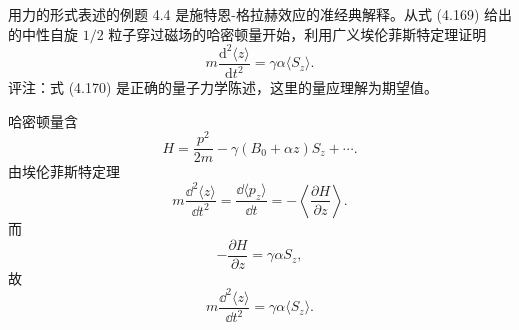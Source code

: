 \begin{question}
用力的形式表述的例题 4.4 是施特恩-格拉赫效应的准经典解释。从式 (4.169) 给出的中性自旋 $1/2$ 粒子穿过磁场的哈密顿量开始，利用广义埃伦菲斯特定理证明
\[
m\frac{\mathrm d^2\langle z\rangle}{\mathrm dt^2}=\gamma\alpha\langle S_z\rangle.
\]
评注：式 (4.170) 是正确的量子力学陈述，这里的量应理解为期望值。

\par\smallskip
{}

\end{question}
\begin{solution}

哈密顿量含
\[
H=\frac{p^2}{2m}-\gamma(B_0+\alpha z)S_z+\cdots.
\]
由埃伦菲斯特定理
\[
m\frac{\dd^2\langle z\rangle}{\dd t^2}=\frac{\dd\langle p_z\rangle}{\dd t}
=-\left\langle\frac{\partial H}{\partial z}\right\rangle.
\]
而
\[
-\frac{\partial H}{\partial z}=\gamma\alpha S_z,
\]
故
\[
m\frac{\dd^2\langle z\rangle}{\dd t^2}=\gamma\alpha\langle S_z\rangle.
\]

\end{solution}

